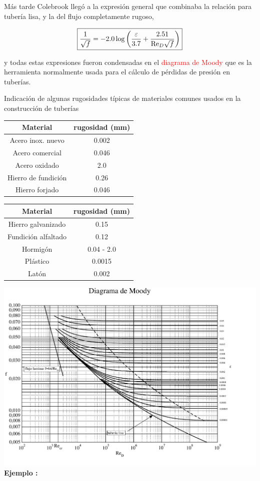Más tarde Colebrook llegó a la expresión general que combinaba la relación para tubería lisa, y la del flujo completamente rugoso,

\begin{equation}
	\boxed{
	\frac{1}{\sqrt{f}} = -2.0 \log \left( \frac{\varepsilon}{3.7} + \frac{2.51}{\text{Re}_D \sqrt{f}} \right)
}
\end{equation}

y todas estas expresiones fueron condensadas en el \textcolor{red}{diagrama de Moody} que es la herramienta normalmente usada para el cálculo de pérdidas de presión en tuberías.

Indicación de algunas rugosidades típicas de materiales comunes usados en la construcción de tuberías

\begin{tabular}{|c|c|}
	\hline \textbf{Material}  & \textbf{rugosidad (mm)} \\
	\hline
	\hline Acero inox. nuevo & 0.002 \\
	\hline Acero comercial & 0.046 \\
	\hline Acero oxidado & 2.0 \\
	\hline Hierro de fundición & 0.26 \\
	\hline Hierro forjado & 0.046 \\
	\hline
\end{tabular}
\begin{tabular}{|c|c|}
	\hline \textbf{Material}  & \textbf{rugosidad (mm)} \\
	\hline
	\hline Hierro galvanizado & 0.15 \\
	\hline Fundición alfaltado & 0.12 \\
	\hline Hormigón  & 0.04 - 2.0 \\
	\hline Plástico & 0.0015 \\
	\hline Latón & 0.002 \\
	\hline
\end{tabular}
\newpage
\vspace*{-3cm}
\includegraphics[scale=0.85,angle=90]{TeX_files/chapter10-Tuberias/moody.pdf}
\newpage
\textbf{Ejemplo :}

